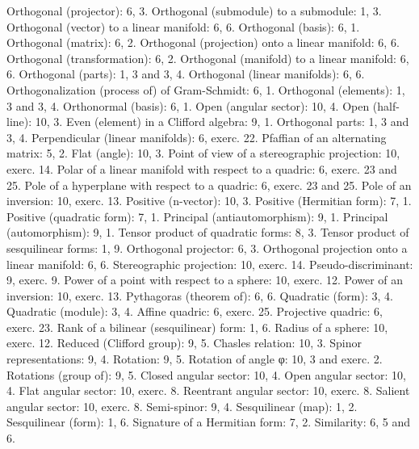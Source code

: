 \begin{Shaded}
\begin{Highlighting}[]
\end{Highlighting}
\end{Shaded}

Orthogonal (projector): 6, 3. Orthogonal (submodule) to a submodule: 1, 3. Orthogonal (vector) to a linear manifold: 6, 6. Orthogonal (basis): 6, 1. Orthogonal (matrix): 6, 2. Orthogonal (projection) onto a linear manifold: 6, 6. Orthogonal (transformation): 6, 2. Orthogonal (manifold) to a linear manifold: 6, 6. Orthogonal (parts): 1, 3 and 3, 4. Orthogonal (linear manifolds): 6, 6. Orthogonalization (process of) of Gram-Schmidt: 6, 1. Orthogonal (elements): 1, 3 and 3, 4. Orthonormal (basis): 6, 1. Open (angular sector): 10, 4. Open (half-line): 10, 3. Even (element) in a Clifford algebra: 9, 1. Orthogonal parts: 1, 3 and 3, 4. Perpendicular (linear manifolds): 6, exerc. 22. Pfaffian of an alternating matrix: 5, 2. Flat (angle): 10, 3. Point of view of a stereographic projection: 10, exerc. 14. Polar of a linear manifold with respect to a quadric: 6, exerc. 23 and 25. Pole of a hyperplane with respect to a quadric: 6, exerc. 23 and 25. Pole of an inversion: 10, exerc. 13. Positive (n-vector): 10, 3. Positive (Hermitian form): 7, 1. Positive (quadratic form): 7, 1. Principal (antiautomorphism): 9, 1. Principal (automorphism): 9, 1. Tensor product of quadratic forms: 8, 3. Tensor product of sesquilinear forms: 1, 9. Orthogonal projector: 6, 3. Orthogonal projection onto a linear manifold: 6, 6. Stereographic projection: 10, exerc. 14. Pseudo-discriminant: 9, exerc. 9. Power of a point with respect to a sphere: 10, exerc. 12. Power of an inversion: 10, exerc. 13. Pythagoras (theorem of): 6, 6. Quadratic (form): 3, 4. Quadratic (module): 3, 4. Affine quadric: 6, exerc. 25. Projective quadric: 6, exerc. 23. Rank of a bilinear (sesquilinear) form: 1, 6. Radius of a sphere: 10, exerc. 12. Reduced (Clifford group): 9, 5. Chasles relation: 10, 3. Spinor representations: 9, 4. Rotation: 9, 5. Rotation of angle φ: 10, 3 and exerc. 2. Rotations (group of): 9, 5. Closed angular sector: 10, 4. Open angular sector: 10, 4. Flat angular sector: 10, exerc. 8. Reentrant angular sector: 10, exerc. 8. Salient angular sector: 10, exerc. 8. Semi-spinor: 9, 4. Sesquilinear (map): 1, 2. Sesquilinear (form): 1, 6. Signature of a Hermitian form: 7, 2. Similarity: 6, 5 and 6.


